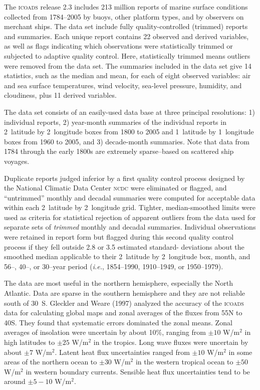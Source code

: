 The \textsc{icoads} release 2.3 includes 213 million reports of marine surface conditions collected from 1784--2005 by buoys, other platform types, and by observers on merchant ships. The data set include fully quality-controlled (trimmed) reports and summaries. Each unique report contains 22 observed and derived variables, as well as flags indicating which observations were statistically trimmed or subjected to adaptive quality control. Here, statistically trimmed means outliers were removed from the data set. The summaries included in the data set give 14 statistics, such as the median and mean, for each of eight observed variables: air and sea surface temperatures, wind velocity, sea-level pressure, humidity, and cloudiness, plus 11 derived variables.

The data set consists of an easily-used data base at three principal resolutions: 1) individual reports, 2) year-month summaries of the individual reports in 2\degrees \ latitude by  2\degrees \ longitude boxes from 1800 to 2005 and 1\degrees \ latitude by  1\degrees \ longitude boxes from 1960 to 2005, and 3) decade-month summaries. Note that data from 1784 through the early 1800s are extremely sparse--based on scattered ship voyages.

Duplicate reports judged inferior by a first quality control process designed by
the National Climatic Data Center \textsc{ncdc} were eliminated or flagged, and
``untrimmed'' monthly and decadal summaries were computed for acceptable data
within each 2\degrees\ latitude by 2\degrees\ longitude grid. Tighter,
median-smoothed limits were used as criteria for statistical rejection of
apparent outliers from the data used for separate sets of \textit{trimmed}
monthly and decadal summaries. Individual observations were retained in report
form but flagged during this second quality control process if they fell outside
2.8 or 3.5 estimated standard- deviations about the smoothed median applicable to
their 2\degrees\ latitude by 2\degrees\ longitude box, month, and 56--, 40--, or
30--year period (\textit{i.e.}, 1854--1990, 1910--1949, or 1950--1979).

The data are most useful in the northern hemisphere, especially the North
Atlantic.  Data are sparse in the southern hemisphere and they are not reliable
south of 30\degrees\ S. Gleckler and Weare (1997) analyzed the
accuracy of the \textsc{icoads} data for calculating global maps
and zonal averages of the fluxes from 55\degrees N to 40\degrees S. They found that systematic
errors dominated the zonal means. Zonal averages of insolation
were uncertain by about 10\%, ranging from $\pm 10$ W/m$^2$ in high latitudes to $\pm 25$
W/m$^2$ in the tropics. Long wave fluxes were uncertain by about $\pm 7$ W/m$^2$. Latent heat
flux uncertainties ranged from
$\pm 10$ W/m$^2$ in some areas of the northern ocean to $\pm 30$ W/m$^2$ in the western
tropical ocean to $\pm 50$ W/m$^2$ in western boundary currents. Sensible heat
flux uncertainties tend to be around $\pm 5- 10$ W/m$^2$.

